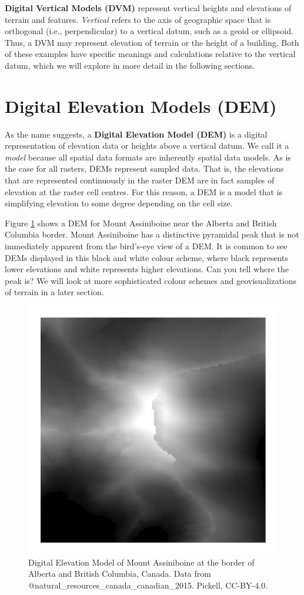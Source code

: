 \documentclass[
]{book}
\begin{document}
\textbf{Digital Vertical Models (DVM)} represent vertical heights and elevations of terrain and features. \emph{Vertical} refers to the axis of geographic space that is orthogonal (i.e., perpendicular) to a vertical datum, such as a geoid or ellipsoid. Thus, a DVM may represent elevation of terrain or the height of a building. Both of these examples have specific meanings and calculations relative to the vertical datum, which we will explore in more detail in the following sections.

\section{Digital Elevation Models (DEM)}\label{digital-elevation-models-dem}

As the name suggests, a \textbf{Digital Elevation Model (DEM)} is a digital representation of elevation data or heights above a vertical datum. We call it a \emph{model} because all spatial data formats are inherently spatial data models. As is the case for all rasters, DEMs represent sampled data. That is, the elevations that are represented continuously in the raster DEM are in fact samples of elevation at the raster cell centres. For this reason, a DEM is a model that is simplifying elevation to some degree depending on the cell size.

Figure \ref{fig:9-mount-assiniboine-dem} shows a DEM for Mount Assiniboine near the Alberta and British Columbia border. Mount Assiniboine has a distinctive pyramidal peak that is not immediately apparent from the bird's-eye view of a DEM. It is common to see DEMs displayed in this black and white colour scheme, where black represents lower elevations and white represents higher elevations. Can you tell where the peak is? We will look at more sophisticated colour schemes and geovisualizations of terrain in a later section.

\begin{figure}
\includegraphics[width=0.75\linewidth]{images/09-mount-assiniboine-dem} \caption{Digital Elevation Model of Mount Assiniboine at the border of Alberta and British Columbia, Canada. Data from @natural_resources_canada_canadian_2015. Pickell, CC-BY-4.0.}\label{fig:9-mount-assiniboine-dem}
\end{figure}
\end{document}
